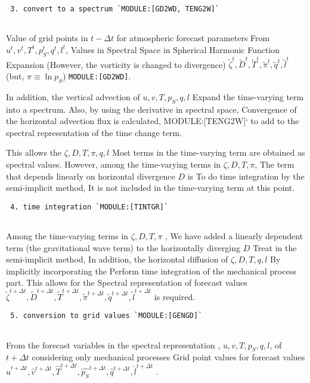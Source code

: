\begin{verbatim}
 3. convert to a spectrum `MODULE:[GD2WD, TENG2W]`
     
\end{verbatim}

Value of grid points in \(t-\Delta t\) for atmospheric forecast
parameters From \(u^{t}, v^{t}, T^{t}, p_S^{t}, q^{t}, l^{t}\), Values
in Spectral Space in Spherical Harmonic Function Expansion (However, the
vorticity is changed to divergence)
\(\tilde{\zeta}^{t}, \tilde{D}^{t}, \tilde{T}^{t}, \tilde{\pi}^{t}, \tilde{q}^{t}, \tilde{l}^{t}\)
(but, \(\pi \equiv \ln p_S\)) \texttt{MODULE:{[}GD2WD{]}}.

In addition, the vertical advection of \(u, v, T, p_S, q, l\) Expand the
time-varying term into a spectrum. Also, by using the derivative in
spectral space, Convergence of the horizontal advection flux is
calculated, MODULE:{[}TENG2W{]}` to add to the spectral representation
of the time change term.

This allows the \(\zeta, D, T, \pi, q, l\) Most terms in the
time-varying term are obtained as spectral values. However, among the
time-varying terms in \(\zeta, D, T, \pi\), The term that depends
linearly on horizontal divergence \(D\) is To do time integration by the
semi-implicit method, It is not included in the time-varying term at
this point.

\begin{verbatim}
 4. time integration `MODULE:[TINTGR]`
     
\end{verbatim}

Among the time-varying terms in \(\zeta, D, T, \pi\) , We have added a
linearly dependent term (the gravitational wave term) to the
horizontally diverging \(D\) Treat in the semi-implicit method, In
addition, the horizontal diffusion of \(\zeta, D, T, q, l\) By
implicitly incorporating the Perform time integration of the mechanical
process part. This allows for the Spectral representation of forecast
values
\(\tilde{\zeta}^{t+\Delta t}, \tilde{D}^{t+\Delta t}, \tilde{T}^{t+\Delta t}, \tilde{\pi}^{t+\Delta t}, \tilde{q}^{t+\Delta t}, \tilde{l}^{t+\Delta t}\)
is required.

\begin{verbatim}
 5. conversion to grid values `MODULE:[GENGD]`
     
\end{verbatim}

From the forecast variables in the spectral representation ,
\(u, v, T, p_S, q, l\), of \(t+\Delta t\) considering only mechanical
processes Grid point values for forecast values
\(\hat{u}^{t+\Delta t}, \hat{v}^{t+\Delta t}, \hat{T}^{t+\Delta t}, \hat{p_S}^{t+\Delta t}, \hat{q}^{t+\Delta t}, \hat{l}^{t+\Delta t}\)
.

